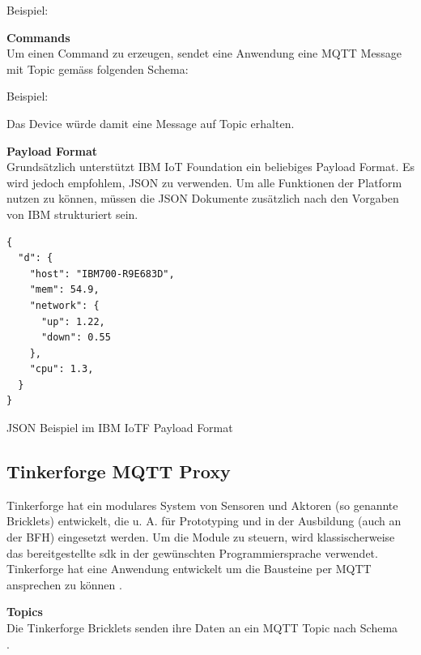 Beispiel: 

\textbf{Commands} \\
Um einen Command zu erzeugen, sendet eine Anwendung eine MQTT Message mit Topic gemäss folgenden Schema:

Beispiel: 

Das Device  würde damit eine Message auf Topic  erhalten.


\textbf{Payload Format} \\
Grundsätzlich unterstützt IBM IoT Foundation ein beliebiges Payload Format. Es wird jedoch empfohlem, JSON zu verwenden. Um alle Funktionen der Platform nutzen zu können, müssen die JSON Dokumente zusätzlich nach den Vorgaben \cite{ibmIotF:payload} von IBM strukturiert sein.

\begin{listing}[H]
\begin{verbatim}
{
  "d": {
    "host": "IBM700-R9E683D",
    "mem": 54.9,
    "network": {
      "up": 1.22,
      "down": 0.55
    },
    "cpu": 1.3,
  }
}
\end{verbatim}
\caption{JSON Beispiel im IBM IoTF Payload Format}
\end{listing}



\subsection{Tinkerforge MQTT Proxy}

Tinkerforge hat ein modulares System von Sensoren und Aktoren (so genannte Bricklets) entwickelt, die u. A. für Prototyping und in der Ausbildung (auch an der BFH) eingesetzt werden. Um die Module zu steuern, wird klassischerweise das bereitgestellte \acrfull{sdk} in der gewünschten Programmiersprache verwendet. 
Tinkerforge hat eine Anwendung entwickelt um die Bausteine per MQTT ansprechen zu können \cite{tinkerf:mqtt}.

\textbf{Topics} \\
Die Tinkerforge Bricklets senden ihre Daten an ein MQTT Topic nach Schema \\ .

